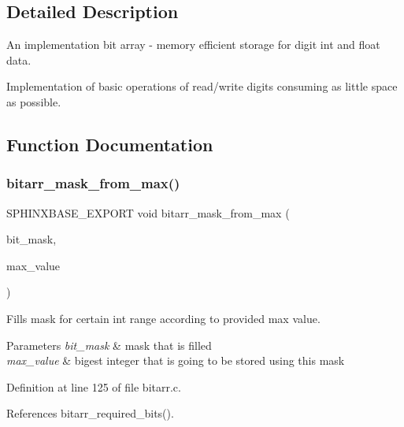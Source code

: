 \subsection{Detailed Description}
An implementation bit array -\/ memory efficient storage for digit int and float data. 

Implementation of basic operations of read/write digits consuming as little space as possible. 

\subsection{Function Documentation}
\mbox{\label{bitarr_8h_ac4e41af285dcd2f5f85037ae7889b57c}} 
\subsubsection{bitarr\+\_\+mask\+\_\+from\+\_\+max()}
{\footnotesize\ttfamily S\+P\+H\+I\+N\+X\+B\+A\+S\+E\+\_\+\+E\+X\+P\+O\+RT void bitarr\+\_\+mask\+\_\+from\+\_\+max (\begin{DoxyParamCaption}\item[{\textbf{ bitarr\+\_\+mask\+\_\+t} $\ast$}]{bit\+\_\+mask,  }\item[{uint32}]{max\+\_\+value }\end{DoxyParamCaption})}



Fills mask for certain int range according to provided max value. 


\begin{DoxyParams}{Parameters}
{\em bit\+\_\+mask} & mask that is filled \\
\hline
{\em max\+\_\+value} & bigest integer that is going to be stored using this mask \\
\hline
\end{DoxyParams}


Definition at line 125 of file bitarr.\+c.



References bitarr\+\_\+required\+\_\+bits().

\mbox{\label{bitarr_8h_aa20810e5fdf947a16c03e262dfb6b46f}} 
